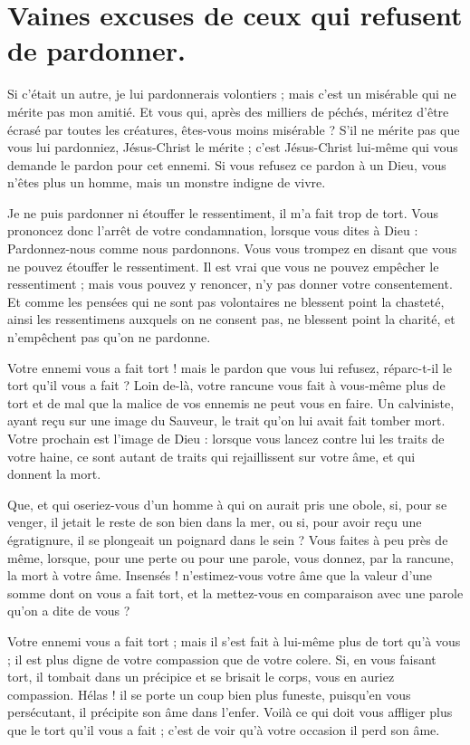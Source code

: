 \documentclass[instructions.tex]{subfiles}
\begin{document}
 
\chapter{Vaines excuses de ceux qui refusent de pardonner.}
 
\primo Si c'était un autre, je lui pardonnerais volontiers ; mais c'est un misérable qui ne mérite pas mon amitié. Et vous qui, après des milliers de péchés, méritez d'être écrasé par toutes les créatures, êtes-vous moins misérable ? S'il ne mérite pas que vous lui pardonniez, Jésus-Christ le mérite ; c'est Jésus-Christ lui-même qui vous demande le pardon pour cet ennemi. Si vous refusez ce pardon à un Dieu, vous n'êtes plus un homme, mais un monstre indigne de vivre.
 
\secundo Je ne puis pardonner ni étouffer le ressentiment, il m'a fait trop de tort. Vous prononcez donc l'arrêt de votre condamnation, lorsque vous dites à Dieu : Pardonnez-nous comme nous pardonnons. Vous vous trompez en disant que vous ne pouvez étouffer le ressentiment. Il est vrai que vous ne pouvez empêcher le ressentiment ; mais vous pouvez y renoncer, n'y pas donner votre consentement. Et comme les pensées qui ne sont pas volontaires ne blessent point la chasteté, ainsi les ressentimens auxquels on ne consent pas, ne blessent point la charité, et n'empêchent pas qu'on ne pardonne.
 
Votre ennemi vous a fait tort ! mais le pardon que vous lui refusez, réparc-t-il le tort qu'il vous a fait ? Loin de-là, votre rancune vous fait à vous-même plus de tort et de mal que la malice de vos ennemis ne peut vous en faire. Un calviniste, ayant reçu sur une image du Sauveur, le trait qu'on lui avait fait tomber mort. Votre prochain est l'image de Dieu : lorsque vous lancez contre lui les traits de votre haine, ce sont autant de traits qui rejaillissent sur votre âme, et qui donnent la mort.
 
Que, et qui oseriez-vous d'un homme à qui on aurait pris une obole, si, pour se venger, il jetait le reste de son bien dans la mer, ou si, pour avoir reçu une égratignure, il se plongeait un poignard dans le sein ? Vous faites à peu près de même, lorsque, pour une perte ou pour une parole, vous donnez, par la rancune, la mort à votre âme. Insensés ! n'estimez-vous votre âme que la valeur d'une somme dont on vous a fait tort, et la mettez-vous en comparaison avec une parole qu'on a dite de vous ?
 
Votre ennemi vous a fait tort ; mais il s'est fait à lui-même plus de tort qu'à vous ; il est plus digne de votre compassion que de votre colere. Si, en vous faisant tort, il tombait dans un précipice et se brisait le corps, vous en auriez compassion. Hélas ! il se porte un coup bien plus funeste, puisqu'en vous persécutant, il précipite son âme dans l'enfer. Voilà ce qui doit vous affliger plus que le tort qu'il vous a fait ; c'est de voir qu'à votre occasion il perd son âme.
 
\end{document}
